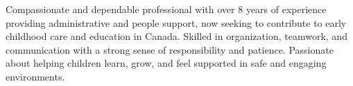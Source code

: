 \begin{cvparagraph}

  Compassionate and dependable professional with over 8 years of experience providing administrative and people support, now seeking to contribute to early childhood care and education in Canada. Skilled in organization, teamwork, and communication with a strong sense of responsibility and patience. Passionate about helping children learn, grow, and feel supported in safe and engaging environments.

\end{cvparagraph}
